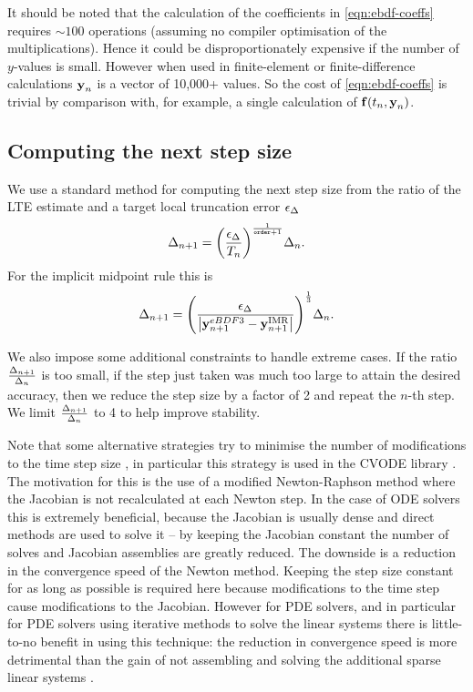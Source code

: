 It should be noted that the calculation of the coefficients in \cref{eqn:ebdf-coeffs} requires $\sim 100$ operations (assuming no compiler optimisation of the multiplications).
Hence it could be disproportionately expensive if the number of $y$-values is small.
However when used in finite-element or finite-difference calculations $\boldsymbol{\mathrm{y}}_n$ is a vector of 10,000+ values.
So the cost of \cref{eqn:ebdf-coeffs} is trivial by comparison with, for example, a single calculation of ${\boldsymbol{\mathrm{f}}{\left( t_n, \boldsymbol{\mathrm{y}}_n \right)}}$.


\subsection{Computing the next step size}

We use a standard method \cite[268]{GreshoSani} for computing the next step size from the ratio of the LTE estimate and a target local truncation error $\epsilon_{\Delta_{}}$
\begin{equation}
  \Delta_{n+1} = {\left(  \frac{\epsilon_{\Delta_{}}}{T_n}  \right)}^{\frac{1}{\texttt{order}+1}} \Delta_{n} .
\end{equation}
For the implicit midpoint rule this is
\begin{equation}
  \Delta_{n+1} = {\left(  \frac{\epsilon_{\Delta_{}}}{\left|{\boldsymbol{\mathrm{y}}_{n+1}^{eBDF3} - \boldsymbol{\mathrm{y}}_{n+1}^{\mathrm{IMR}}} \right|}  \right)}^{\frac{1}{3}}  \Delta_{n}.
  \label{eq:next-step-dt}
\end{equation}

We also impose some additional constraints to handle extreme cases.
If the ratio $\frac{\Delta_{n+1}}{\Delta_{n}}$ is too small, \ie if the step just taken was much too large to attain the desired accuracy, then we reduce the step size by a factor of 2 and repeat the $n$-th step.
We limit $\frac{\Delta_{n+1}}{\Delta_{n}}$ to 4 to help improve stability.

Note that some alternative strategies try to minimise the number of modifications to the time step size \cite[Chap. 6]{Iserles2009}, in particular this strategy is used in the CVODE library \cite[Sec. 2.1]{cvode-manual}.
The motivation for this is the use of a modified Newton-Raphson method where the Jacobian is not recalculated at each Newton step.
In the case of ODE solvers this is extremely beneficial, because the Jacobian is usually dense and direct methods are used to solve it -- by keeping the Jacobian constant the number of solves and Jacobian assemblies are greatly reduced.
The downside is a reduction in the convergence speed of the Newton method.
Keeping the step size constant for as long as possible is required here because modifications to the time step cause modifications to the Jacobian.
However for PDE solvers, and in particular for PDE solvers using iterative methods to solve the linear systems there is little-to-no benefit in using this technique: the reduction in convergence speed is more detrimental than the gain of not assembling and solving the additional sparse linear systems \cite[128]{Iserles2009}.


